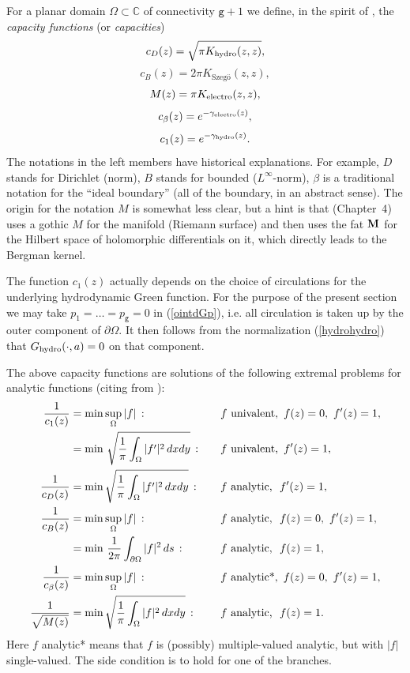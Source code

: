 \documentclass[reqno,12pt]{article}
\theoremstyle{plain}
\theoremstyle{definition}
\numberwithin{equation}{section}
\numberwithin{figure}{section}
\def\C{{\mathbb C}}
\begin{document}
For a planar domain $\Omega\subset\C$ of connectivity $\texttt{g}+1$ we define,
in the spirit of \cite{Sario-Oikawa-1969, Hejhal-1972}, the {\it capacity functions} (or {\it capacities})
$$
c_D(z)=\sqrt{\pi K_{\rm hydro}(z,z)},
$$
$$
c_B(z)=2\pi K_\text{Szeg\"o}(z,z),
$$
$$
M(z)=\pi K_{\rm electro}(z,z),
$$
$$
c_\beta(z)=e^{-\gamma_{\rm electro}(z)},
$$
$$
c_1(z)=e^{-\gamma_{\rm hydro}(z)}.
$$
The notations in the left members have historical explanations. For example, $D$ stands for Dirichlet (norm),
$B$ stands for bounded ($L^\infty$-norm), $\beta$ is a traditional notation for the ``ideal boundary'' (all of the boundary,
in an abstract sense).
The origin for the notation $M$ is somewhat less clear, but a hint is that \cite{Schiffer-Spencer-1954} 
({Chapter~4}) uses a gothic $M$ for the manifold (Riemann surface) and then uses the fat ${\bf M}$ for the Hilbert
space of holomorphic differentials on it, which directly leads to the Bergman kernel.

The function $c_1(z)$ actually depends on the choice of circulations for the underlying hydrodynamic Green function. For the
purpose of the present section we may take $p_1=\dots=p_\texttt{g}=0$ in (\ref{ointdGp}), i.e. all circulation is taken up by  
the outer component of $\partial\Omega$. It then follows from the normalization (\ref{hydrohydro}) that 
$G_{\rm hydro}(\cdot,a)=0$ on that component.

The above capacity functions are solutions of the following extremal problems for analytic functions (citing from \cite{Sario-Oikawa-1969}):
\begin{align*} 
\frac{1}{c_1(z)}&= \min \sup_\Omega |f| \,: \quad&& f \text{ univalent, \,} f(z)=0,\,\, f^\prime (z)=1,\\
&= \min\, \sqrt{\frac{1}{\pi} \int_\Omega |f^\prime |^2\,dxdy }\,: \quad&& f \text{ univalent, \,}  f^\prime (z)=1,\\
\frac{1}{c_D(z)}& = \min \sqrt{\frac{1}{\pi} \int_\Omega |f^\prime|^2\,dxdy }\,: \quad&& f \text{ analytic, \,\,} f^\prime (z)=1,\\
\frac{1}{c_B(z)}&= \min \sup_\Omega |f|\,: \quad&&f \text{ analytic, \,\,} f(z)=0,\,\, f^\prime (z)=1, \\
&=\min \, \frac{1}{2\pi} \int_{\partial\Omega} |f|^2 \,ds \,: \quad&& f \text{ analytic, \,\,} f(z)=1,\\
\frac{1}{c_\beta(z)}&= \min \sup_\Omega |f|\,:\quad&&   f \text{ analytic*, \,} f(z)=0,\,\, f^\prime (z)=1 ,\\
\frac{1}{\sqrt{M(z)}}& = \min \sqrt{\frac{1}{\pi} \int_\Omega |f|^2\,dxdy } \,: \quad&& f \text{ analytic, \,\,} f(z)=1.\\
\end{align*}
Here $f$ analytic* means that $f$ is (possibly) multiple-valued analytic, but with $|f|$ single-valued. 
The side condition is to hold for one of the branches. 
\end{document}
